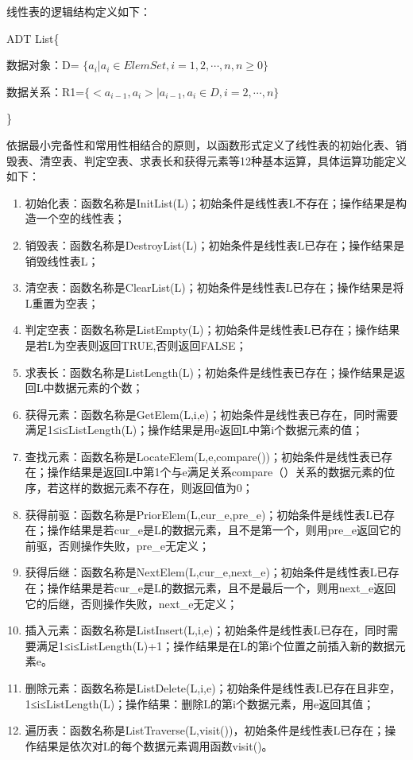 \documentclass[supercite]{Experimental_Report}
\theoremstyle{definition}
\begin{document}
线性表的逻辑结构定义如下：

ADT List\{

数据对象：D= $\{ a_{i} | a_{i} \in ElemSet,i=1,2,\cdots,n,n≥0\}$

数据关系：R1=$\{ <a_{i-1},a_{i}> | a_{i-1},a_{i}\in D,i=2,\cdots,n\}$

\}

依据最小完备性和常用性相结合的原则，以函数形式定义了线性表的初始化表、销毁表、清空表、判定空表、求表长和获得元素等12种基本运算，具体运算功能定义如下：

\begin{enumerate}
    \item 初始化表：函数名称是InitList(L)；初始条件是线性表L不存在；操作结果是构造一个空的线性表；
    \item 销毁表：函数名称是DestroyList(L)；初始条件是线性表L已存在；操作结果是销毁线性表L；
    \item 清空表：函数名称是ClearList(L)；初始条件是线性表L已存在；操作结果是将L重置为空表；
    \item 判定空表：函数名称是ListEmpty(L)；初始条件是线性表L已存在；操作结果是若L为空表则返回TRUE,否则返回FALSE；
    \item 求表长：函数名称是ListLength(L)；初始条件是线性表已存在；操作结果是返回L中数据元素的个数；
    \item 获得元素：函数名称是GetElem(L,i,e)；初始条件是线性表已存在，同时需要满足1≤i≤ListLength(L)；操作结果是用e返回L中第i个数据元素的值；
    \item 查找元素：函数名称是LocateElem(L,e,compare())；初始条件是线性表已存在；操作结果是返回L中第1个与e满足关系compare（）关系的数据元素的位序，若这样的数据元素不存在，则返回值为0；
	\item 获得前驱：函数名称是PriorElem(L,cur\_e,pre\_e)；初始条件是线性表L已存在；操作结果是若cur\_e是L的数据元素，且不是第一个，则用pre\_e返回它的前驱，否则操作失败，pre\_e无定义；
	\item 获得后继：函数名称是NextElem(L,cur\_e,next\_e)；初始条件是线性表L已存在；操作结果是若cur\_e是L的数据元素，且不是最后一个，则用next\_e返回它的后继，否则操作失败，next\_e无定义；
	\item 插入元素：函数名称是ListInsert(L,i,e)；初始条件是线性表L已存在，同时需要满足1≤i≤ListLength(L)+1；操作结果是在L的第i个位置之前插入新的数据元素e。
	\item 删除元素：函数名称是ListDelete(L,i,e)；初始条件是线性表L已存在且非空，1≤i≤ListLength(L)；操作结果：删除L的第i个数据元素，用e返回其值；
	\item 遍历表：函数名称是ListTraverse(L,visit())，初始条件是线性表L已存在；操作结果是依次对L的每个数据元素调用函数visit()。
\end{enumerate}
\end{document}

